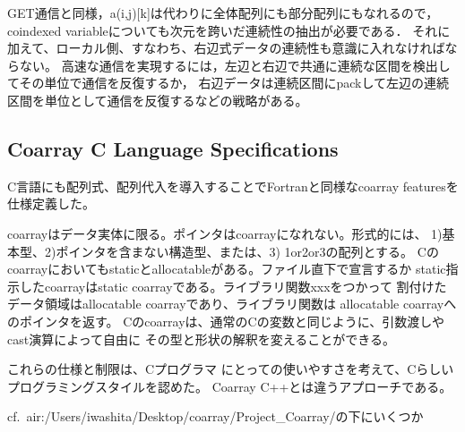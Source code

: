 GET通信と同様，a(i,j)[k]は代わりに全体配列にも部分配列にもなれるので，
coindexed variableについても次元を跨いだ連続性の抽出が必要である．
それに加えて、ローカル側、すなわち、右辺式データの連続性も意識に入れなければならない。
高速な通信を実現するには，左辺と右辺で共通に連続な区間を検出してその単位で通信を反復するか，
右辺データは連続区間にpackして左辺の連続区間を単位として通信を反復するなどの戦略がある。



\subsection{Coarray C Language Specifications}

C言語にも配列式、配列代入を導入することでFortranと同様なcoarray featuresを仕様定義した。

coarrayはデータ実体に限る。ポインタはcoarrayになれない。形式的には、
1)基本型、2)ポインタを含まない構造型、または、3) 1or2or3の配列とする。
Cのcoarrayにおいてもstaticとallocatableがある。ファイル直下で宣言するか
static指示したcoarrayはstatic coarrayである。ライブラリ関数xxxをつかって
割付けたデータ領域はallocatable coarrayであり、ライブラリ関数は
allocatable coarrayへのポインタを返す。
Cのcoarrayは、通常のCの変数と同じように、引数渡しやcast演算によって自由に
その型と形状の解釈を変えることができる。

これらの仕様と制限は、Cプログラマ
にとっての使いやすさを考えて、Cらしいプログラミングスタイルを認めた。
Coarray C++とは違うアプローチである。

cf.\ air:/Users/iwashita/Desktop/coarray/Project\_Coarray/の下にいくつか

